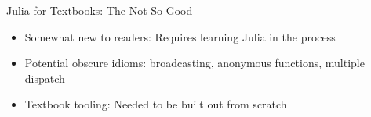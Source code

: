 \begin{frame}[fragile]{Julia for Textbooks: \textcolor{cardinal}{The Not-So-Good}}
    
\pause

\begin{itemize}
  \item \textcolor{cardinal}{Somewhat new to readers:} Requires learning Julia in the process \pause
  \item \textcolor{cardinal}{Potential obscure idioms:} broadcasting, anonymous functions, multiple dispatch \pause
  \item \textcolor{cardinal}{Textbook tooling:} Needed to be built out from scratch
\end{itemize}

\end{frame}